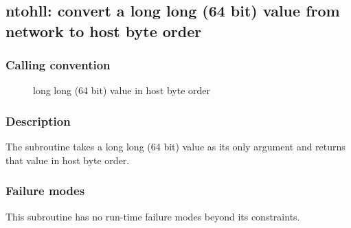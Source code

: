 \clearpage
{}
{}
\label{subr:ntohll}
\subsection*{ntohll: convert a long long (64 bit) value from network
  to host byte order}

\subsubsection*{Calling convention}

\begin{description}
\item[] long long (64 bit) value in host byte order
\end{description}

\subsubsection*{Description}

The  subroutine takes a long long (64 bit) value as
its only argument and returns that value in host byte order.

\subsubsection*{Failure modes}

This subroutine has no run-time failure modes beyond its constraints.

